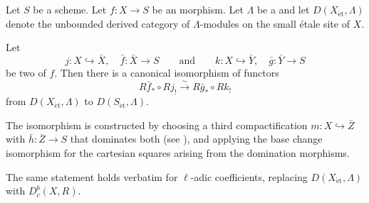 \begin{theorem} \label{theorem:derived_direct_image_with_proper_support_independent_of_compactification_up_to_canonical_isomorphism}
Let $S$ be a scheme. Let $f: X \to S$ be an  morphism. Let $\Lambda$ be a  and let $D(X_{\acute{\text{e}}\text{t}}, \Lambda)$ denote the unbounded derived category of $\Lambda$-modules on the small \'etale site of $X$.

Let
$$
j: X \hookrightarrow \bar{X}, \quad \bar{f}: \bar{X} \to S
\qquad\text{and}\qquad
k: X \hookrightarrow \bar{Y}, \quad \bar{g}: \bar{Y} \to S
$$
be two  of $f$. Then there is a canonical isomorphism of functors
$$
R\bar{f}_* \circ Rj_! \xrightarrow{\,\sim\,} R\bar{g}_* \circ Rk_!
$$
from $D(X_{\acute{\text{e}}\text{t}}, \Lambda)$ to $D(S_{\acute{\text{e}}\text{t}}, \Lambda)$.

The isomorphism is constructed by choosing a third compactification $m: X \hookrightarrow \bar{Z}$ with $\bar{h}: \bar{Z} \to S$ that dominates both (see ), and applying the base change isomorphism for the cartesian squares arising from the domination morphisms.

The same statement holds verbatim for $\ell$-adic coefficients, replacing $D(X_{\acute{\text{e}}\text{t}}, \Lambda)$ with $D_c^b(X, R)$.
\end{theorem}
